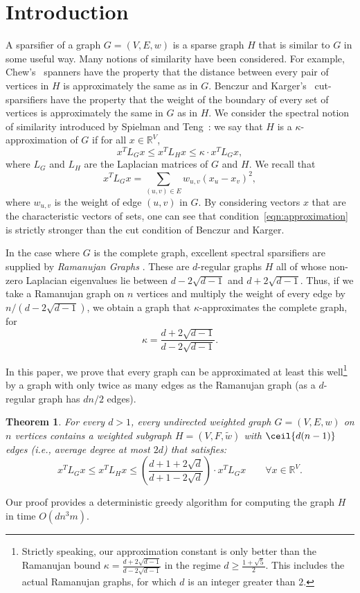 \documentclass[12pt]{article}
\newcommand{\R}{\mathbb{R}}
\newtheorem{theorem}{Theorem}[section]
\begin{document}
\section{Introduction}\label{sec:intro}
A sparsifier of a graph $G = (V,E,w)$ is a sparse graph $H$ that is similar to
  $G$ in some useful way.
Many notions of similarity have been considered.
For example, Chew's~\cite{PaulChew} spanners have the property that the distance
  between every pair of vertices in $H$ is approximately the same as in $G$.
Benczur and Karger's~\cite{BenczurKarger} cut-sparsifiers have the property
  that the weight of the boundary of every set of vertices is approximately
  the same in $G$ as in $H$.
We consider the spectral notion of similarity introduced
  by Spielman and Teng~\cite{SpielmanTengPrecon,SpielmanTengSparsifier}:
  we say that $H$ is a $\kappa$-approximation of $G$ if for all
  $x \in \R^{V}$,
\begin{equation}\label{eqn:approximation}
 x^{T} L_G x \leq 
        x^{T} L_{H} x
  \leq
  \kappa\cdot
        x^{T} L_{G} x,
\end{equation}
where $L_{G}$ and $L_{H}$ are the Laplacian matrices of $G$ and $H$.
We recall that
\[
x^{T} L_{G} x = 
\sum_{(u,v) \in E} w_{u,v} (x_{u} - x_{v})^{2},
\]
where $w_{u,v}$ is the weight of edge $(u,v)$ in $G$.
By considering vectors $x$ that are the characteristic vectors of sets,
  one can see that condition~\eqref{eqn:approximation}
  is strictly stronger than the cut
  condition of Benczur and Karger.

In the case where $G$ is the complete graph, excellent spectral
  sparsifiers are supplied
  by \textit{Ramanujan Graphs} \cite{LPS,Margulis}.
These are $d$-regular graphs $H$ 
  all of whose non-zero Laplacian eigenvalues lie between
  $d - 2 \sqrt{d-1}$ and $d + 2 \sqrt{d-1}$.
Thus, if we take a Ramanujan graph on $n$ vertices and
  multiply the weight of every edge by
  $n / (d - 2 \sqrt{d-1})$, we obtain a graph
  that
   $\kappa$-approximates
  the complete graph, for 
\[
  \kappa  = \frac{d+2\sqrt{d-1}}{d-2\sqrt{d-1}}.
\]
  
In this paper, we prove that
  every graph can be approximated at least this 
  well\footnote{
Strictly speaking, our approximation constant is only better than the Ramanujan
  bound $\kappa=\frac{d+2\sqrt{d-1}}{d-2\sqrt{d-1}}$ in the regime $d\ge
  \frac{1+\sqrt{5}}{2}$.
  This includes the actual Ramanujan graphs, for which $d$ is an integer greater
  than $2$.}
     by a graph with only twice as many edges 
  as the Ramanujan graph
  (as a $d$-regular graph has $dn/2$ edges).
\begin{theorem}\label{thm:mainthm}
For every $d>1$, 
  every undirected weighted graph $G=(V,E,w)$ on $n$ vertices
  contains a weighted subgraph $H=(V,F,\tilde{w})$ with $\ceil{d(n-1)}$
  edges (i.e., average degree at most $2d$) that satisfies:
\[
 x^T L_G x \leq 
        x^{T} L_{H} x
    \leq
\left(\frac{d+1+2\sqrt{d}}{d+1-2\sqrt{d}}\right)
      \cdot
      x^{T} L_{G} x
      \qquad\forall x\in\R^V.
\]
\end{theorem}
Our proof provides
  a deterministic greedy algorithm for computing the graph $H$ in 
  time   $O (d n^{3} m)$.
\end{document}
